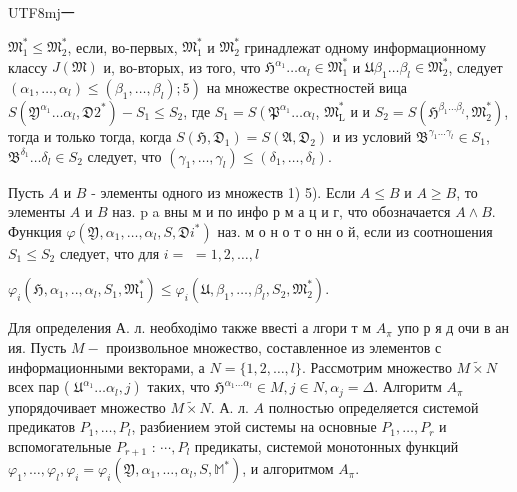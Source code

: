 \documentclass[10pt]{article}
\begin{document}
\begin{CJK}{UTF8}{mj}一\end{CJK} $\mathfrak{M}_{1}^{*} \leqslant \mathfrak{M}_{2}^{*}$, если, во-первых, $\mathfrak{M}_{1}^{*}$ и $\mathfrak{M}_{2}^{*}$ гринадлежат одному информационному классу $J(\mathfrak{M})$ и, во-вторых, из того, что $\mathfrak{H}^{\alpha_{1}} \ldots \alpha_{l} \in \mathfrak{M}_{1}^{*}$ и $\mathfrak{U} \beta_{1} \ldots \beta_{l} \in \mathfrak{M}_{2}^{*}$, следует $\left.\left(\alpha_{1}, \ldots, \alpha_{l}\right) \leqslant\left(\beta_{1}, \ldots, \beta_{l}\right) ; 5\right)$ на множестве окрестностей вица $S\left(\mathfrak{Y}^{\alpha_{1}} \ldots \alpha_{l}, \mathfrak{D} \mathfrak{2}^{*}\right)-S_{1} \leqslant S_{2}$, где $S_{1}=S\left(\mathfrak{P}^{\alpha_{1}} \ldots \alpha_{l}\right.$, $\mathfrak{M}_{\mathrm{L}}^{*}$ и и $S_{2}=S\left(\mathfrak{H}^{\beta_{1} \ldots \beta_{l}}, \mathfrak{M}_{2}^{*}\right)$, тогда и только тогда, когда $S\left(\mathfrak{H}, \mathfrak{D}_{1}\right)=S\left(\mathfrak{A}, \mathfrak{D}_{2}\right)$ и из условий $\mathfrak{B}^{\gamma_{1} \ldots \gamma_{l}} \in S_{1}$, $\mathfrak{B}^{\delta_{1}} \ldots \delta_{l} \in S_{2}$ следует, что $\left(\gamma_{1}, \ldots, \gamma_{l}\right) \leqslant\left(\delta_{1}, \ldots, \delta_{l}\right)$.



Пусть $A$ и $B$ - элементы одного из множеств 1) 5). Если $A \leqslant B$ и $A \geqslant B$, то элементы $A$ и $B$ наз. p a вны м и по инфо р м а ц и г, что обозначается $A \wedge B$. Функция $\varphi\left(\mathfrak{Y}, \alpha_{1}, \ldots, \alpha_{l}, S, \mathfrak{D} i^{*}\right)$ наз. м о н о т о нн о й, если из соотношения $S_{1} \leqslant S_{2}$ следует, что для $i=$ $=1,2, \ldots, l$



$\varphi_{i}\left(\mathfrak{H}, \alpha_{1}, . ., \alpha_{l}, S_{1}, \mathfrak{M}_{1}^{*}\right) \leqslant \varphi_{i}\left(\mathfrak{U}, \beta_{1}, \ldots, \beta_{l}, S_{2}, \mathfrak{M}_{2}^{*}\right)$.



Для определения А. л. необходімо также ввесті а лгори т м $A_{\pi}$ упо р я д очи в ан ия. Пусть $M-$ произвольное множество, составленное из элементов с информационными векторами, а $N=\{1,2, \ldots, l\}$. Рассмотрим множество $M \widetilde{\times} N$ всех пар ( $\left.\mathfrak{U}^{\alpha_{1}} \ldots \alpha_{l}, j\right)$ таких, что $\mathfrak{H}^{\alpha_{1} \ldots \alpha_{l}} \in M, j \in N, \alpha_{j}=\Delta$. Алгоритм $A_{\pi}$ упорядочивает множество $M \widetilde{\times} N$. А. л. $A$ полностью определяется системой предикатов $P_{1}, \ldots, P_{l}$, разбиением этой системы на основные $P_{1}, \ldots, P_{r}$ и вспомогательные $P_{r+1}$ : $\cdots, P_{l}$ предикаты, системоӥ монотонных функций $\varphi_{1}, \ldots, \varphi_{l}, \varphi_{i}=\varphi_{i}\left(\mathfrak{Y}, \alpha_{1}, \ldots, \alpha_{l}, S, \mathbb{M}^{*}\right)$, и алгоритмом $A_{\pi}$.
\end{document}
